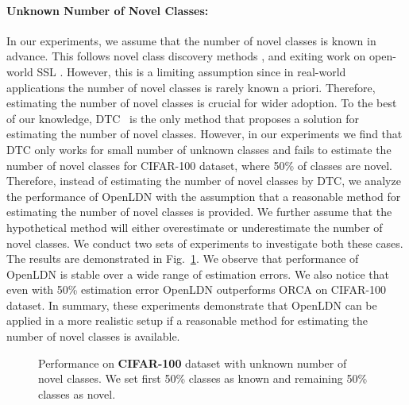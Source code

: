 \documentclass[runningheads]{eccv2022submission}
\begin{document}
\paragraph{\textbf{Unknown Number of Novel Classes:}}
\label{par:unknown}
In our experiments, we assume that the number of novel classes is known in advance. This follows novel class discovery methods \cite{han2019learning,Han2020Automatically,fini2021unified}, and exiting work on open-world SSL \cite{cao2022openworld}. However, this is a limiting assumption since in real-world applications the number of novel classes is rarely known a priori. Therefore, estimating the number of novel classes is crucial for wider adoption. To the best of our knowledge, DTC~\cite{han2019learning} is the only method that proposes a solution for estimating the number of novel classes. However, in our experiments we find that DTC only works for small number of unknown classes and fails to estimate the number of novel classes for CIFAR-100 dataset, where 50\% of classes are novel. Therefore, instead of estimating the number of novel classes by DTC, we analyze the performance of OpenLDN with the assumption that a reasonable method for estimating the number of novel classes is provided. We further assume that the hypothetical method will either overestimate or underestimate the number of novel classes. We conduct two sets of experiments to investigate both these cases. The results are demonstrated in Fig.~\ref{fig:unknown_class}. We observe that performance of OpenLDN is stable over a wide range of estimation errors. We also notice that even with 50\% estimation error OpenLDN outperforms ORCA on CIFAR-100 dataset. In summary, these experiments demonstrate that OpenLDN can be applied in a more realistic setup if a reasonable method for estimating the number of novel classes is available. 

\begin{figure}[t]
\captionsetup[subfloat]{labelformat=empty}
\centering
    \qquad


    \vspace{-8mm}
    \caption{\small Performance on \textbf{CIFAR-100} dataset with unknown number of novel classes. We set first 50\% classes as known and remaining 50\% classes as novel.}
    \label{fig:unknown_class}\vspace{-6mm}
\end{figure}
\end{document}
